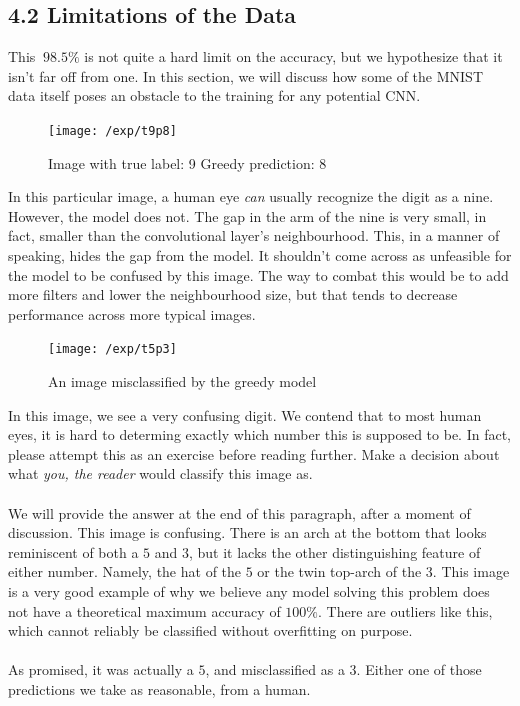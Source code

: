\documentclass{article}
\begin{document}
\subsection*{4.2 Limitations of the Data}
This $~98.5\%$ is not quite a hard limit on the accuracy, but we hypothesize that it isn't far off from one. In this section, we will discuss how some of the MNIST data itself poses an obstacle to the training for any potential CNN.
\begin{figure}[H]
\texttt{[image: /exp/t9p8]}
\caption{Image with true label: 9 Greedy prediction: 8}
\end{figure}
In this particular image, a human eye \textit{can} usually recognize the digit as a nine. However, the model does not. The gap in the arm of the nine is very small, in fact, smaller than the convolutional layer's neighbourhood. This, in a manner of speaking, hides the gap from the model. It shouldn't come across as unfeasible for the model to be confused by this image. The way to combat this would be to add more filters and lower the neighbourhood size, but that tends to decrease performance across more typical images.
\begin{figure}[H]
\texttt{[image: /exp/t5p3]}
\caption{An image misclassified by the greedy model}
\end{figure}
In this image, we see a very confusing digit. We contend that to most human eyes, it is hard to determing exactly which number this is supposed to be. In fact, please attempt this as an exercise before reading further. Make a decision about what \textit{you, the reader} would classify this image as.\\\\
We will provide the answer at the end of this paragraph, after a moment of discussion. This image is confusing. There is an arch at the bottom that looks reminiscent of both a $5$ and $3$, but it lacks the other distinguishing feature of either number. Namely, the hat of the $5$ or the twin top-arch of the $3$. This image is a very good example of why we believe any model solving this problem does not have a theoretical maximum accuracy of $100\%$. There are outliers like this, which cannot reliably be classified without overfitting on purpose.\\\\
As promised, it was actually a $5$, and misclassified as a $3$. Either one of those predictions we take as reasonable, from a human.
\end{document}
